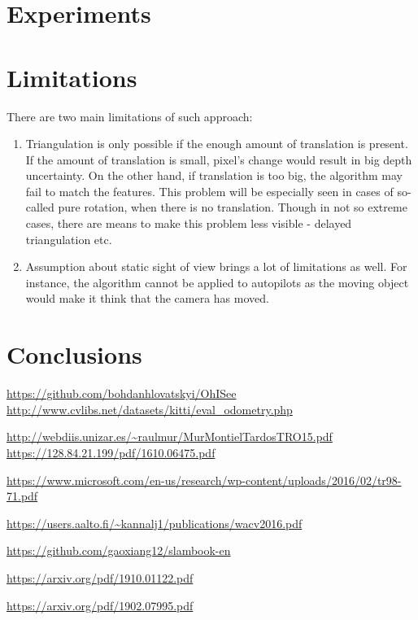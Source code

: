 \section{Experiments}

\section{Limitations}

There are two main limitations of such approach:
\begin{enumerate}
    \item Triangulation is only possible if the enough amount of translation is present. If the amount of translation is small, pixel's change would result in big depth uncertainty. On the other hand, if translation is too big, the algorithm may fail to match the features. This problem will be especially seen in cases of so-called pure rotation, when there is no translation. Though in not so extreme cases, there are means to make this problem less visible - delayed triangulation etc.
    \item Assumption about static sight of view brings a lot of limitations as well.  For instance, the algorithm cannot be applied to autopilots as the moving object would make it think that the camera has moved. 
\end{enumerate}

\section{Conclusions}

\appendix

\begin{thebibliography}{10}

 \url{https://github.com/bohdanhlovatskyi/OhISee}
 \url{http://www.cvlibs.net/datasets/kitti/eval_odometry.php}

 \url{http://webdiis.unizar.es/~raulmur/MurMontielTardosTRO15.pdf}
 \url{https://128.84.21.199/pdf/1610.06475.pdf}

 \url{https://www.microsoft.com/en-us/research/wp-content/uploads/2016/02/tr98-71.pdf} 

 \url{https://users.aalto.fi/~kannalj1/publications/wacv2016.pdf}

 \url{https://github.com/gaoxiang12/slambook-en}

 \url{https://arxiv.org/pdf/1910.01122.pdf}

 \url{https://arxiv.org/pdf/1902.07995.pdf}

\end{thebibliography}



